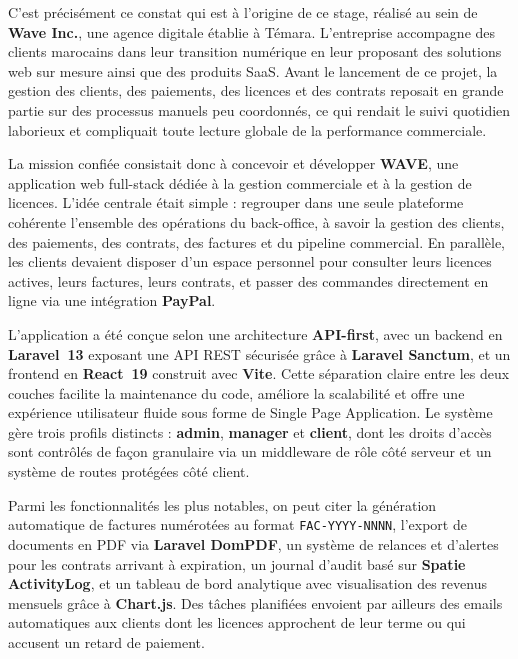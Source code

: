 \documentclass[12pt, a4paper]{report}
\newcommand{\wave}{\textbf{\color{WaveBlue}WAVE}}
\begin{document}
\vspace{0.6cm}

C'est précisément ce constat qui est à l'origine de ce stage, réalisé au
sein de \textbf{Wave Inc.}, une agence digitale établie à Témara. L'entreprise
accompagne des clients marocains dans leur transition numérique en leur
proposant des solutions web sur mesure ainsi que des produits SaaS. Avant
le lancement de ce projet, la gestion des clients, des paiements, des
licences et des contrats reposait en grande partie sur des processus
manuels peu coordonnés, ce qui rendait le suivi quotidien laborieux et
compliquait toute lecture globale de la performance commerciale.

\vspace{0.6cm}

La mission confiée consistait donc à concevoir et développer \wave{}, une
application web full-stack dédiée à la gestion commerciale et à la gestion
de licences. L'idée centrale était simple : regrouper dans une seule
plateforme cohérente l'ensemble des opérations du back-office, à savoir
la gestion des clients, des paiements, des contrats, des factures et du
pipeline commercial. En parallèle, les clients devaient disposer d'un
espace personnel pour consulter leurs licences actives, leurs factures,
leurs contrats, et passer des commandes directement en ligne via une
intégration \textbf{PayPal}.

\vspace{0.6cm}

L'application a été conçue selon une architecture \textbf{API-first},
avec un backend en \textbf{Laravel~13} exposant une API REST sécurisée
grâce à \textbf{Laravel Sanctum}, et un frontend en \textbf{React~19}
construit avec \textbf{Vite}. Cette séparation claire entre les deux
couches facilite la maintenance du code, améliore la scalabilité et
offre une expérience utilisateur fluide sous forme de Single Page
Application. Le système gère trois profils distincts : \textbf{admin},
\textbf{manager} et \textbf{client}, dont les droits d'accès sont
contrôlés de façon granulaire via un middleware de rôle côté serveur
et un système de routes protégées côté client.

\vspace{0.6cm}

Parmi les fonctionnalités les plus notables, on peut citer la génération
automatique de factures numérotées au format \texttt{FAC-YYYY-NNNN},
l'export de documents en PDF via \textbf{Laravel DomPDF}, un système
de relances et d'alertes pour les contrats arrivant à expiration, un
journal d'audit basé sur \textbf{Spatie ActivityLog}, et un tableau
de bord analytique avec visualisation des revenus mensuels grâce à
\textbf{Chart.js}. Des tâches planifiées envoient par ailleurs des
emails automatiques aux clients dont les licences approchent de leur
terme ou qui accusent un retard de paiement.
\end{document}
